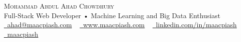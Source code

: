 \documentclass[12pt,a4paper]{article}
\newcommand{\resumeSubHeadingListStart}{\begin{itemize}[leftmargin=0.0in, label={}]\itemsep0.75em}
\newcommand{\resumeSubHeadingListEnd}{\end{itemize}}
\begin{document}
\begin{center}
  {\Huge \scshape Mohammad Abdul Ahad Chowdhury} \\ \vspace{5pt}
  Full-Stack Web Developer • Machine Learning and Big Data Enthusiast \\ \vspace{5pt}
  \small \href{mailto:ahad@maacpiash.com}{\raisebox{-0.2\height}\faEnvelope\  \underline{ahad@maacpiash.com}} ~ \href{https://www.maacpiash.com}{\raisebox{-0.2\height}\faGlobe\ \underline{www.maacpiash.com}} ~ 
  \href{https://linkedin.com/in/maacpiash}{\raisebox{-0.2\height}\faLinkedin\ \underline{linkedin.com/in/maacpiash}}  ~
  \href{https://github.com/maacpiash}{\raisebox{-0.2\height}\faGithub\ \underline{maacpiash}}
  \vspace{-5pt}
\end{center}




\end{document}
